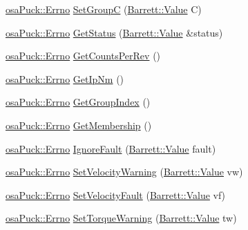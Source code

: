 \begin{DoxyCompactItemize}
\hyperlink{classosa_puck_af19c88d20083577d3a676353b4902391}{osa\-Puck\-::\-Errno} \hyperlink{classosa_puck_aed77aa5ecd5457a40cf0ccb3d2824a24}{Set\-Group\-C} (\hyperlink{struct_barrett_a57ff132885344ca62e4b4b691885685b}{Barrett\-::\-Value} C)
\item 
\hyperlink{classosa_puck_af19c88d20083577d3a676353b4902391}{osa\-Puck\-::\-Errno} \hyperlink{classosa_puck_a0446abb0c8bd038b8b496b1f02382228}{Get\-Status} (\hyperlink{struct_barrett_a57ff132885344ca62e4b4b691885685b}{Barrett\-::\-Value} \&status)
\item 
\hyperlink{classosa_puck_af19c88d20083577d3a676353b4902391}{osa\-Puck\-::\-Errno} \hyperlink{classosa_puck_a0908a1d52a613fcbbb618bdfb4d5df3a}{Get\-Counts\-Per\-Rev} ()
\item 
\hyperlink{classosa_puck_af19c88d20083577d3a676353b4902391}{osa\-Puck\-::\-Errno} \hyperlink{classosa_puck_abf8a7cea87cd6c9abaa0824363bf9b09}{Get\-Ip\-Nm} ()
\item 
\hyperlink{classosa_puck_af19c88d20083577d3a676353b4902391}{osa\-Puck\-::\-Errno} \hyperlink{classosa_puck_a3819526af24bd0f59b87dba646582182}{Get\-Group\-Index} ()
\item 
\hyperlink{classosa_puck_af19c88d20083577d3a676353b4902391}{osa\-Puck\-::\-Errno} \hyperlink{classosa_puck_aff66b18a4130053888198421bfd1b09c}{Get\-Membership} ()
\item 
\hyperlink{classosa_puck_af19c88d20083577d3a676353b4902391}{osa\-Puck\-::\-Errno} \hyperlink{classosa_puck_a4e084f70855cf653e18625d969219609}{Ignore\-Fault} (\hyperlink{struct_barrett_a57ff132885344ca62e4b4b691885685b}{Barrett\-::\-Value} fault)
\item 
\hyperlink{classosa_puck_af19c88d20083577d3a676353b4902391}{osa\-Puck\-::\-Errno} \hyperlink{classosa_puck_a8eb0fa1e2bbfbbc6d5367de197f55073}{Set\-Velocity\-Warning} (\hyperlink{struct_barrett_a57ff132885344ca62e4b4b691885685b}{Barrett\-::\-Value} vw)
\item 
\hyperlink{classosa_puck_af19c88d20083577d3a676353b4902391}{osa\-Puck\-::\-Errno} \hyperlink{classosa_puck_a709f07a317629af72d819cdb7f182f30}{Set\-Velocity\-Fault} (\hyperlink{struct_barrett_a57ff132885344ca62e4b4b691885685b}{Barrett\-::\-Value} vf)
\item 
\hyperlink{classosa_puck_af19c88d20083577d3a676353b4902391}{osa\-Puck\-::\-Errno} \hyperlink{classosa_puck_a475a911fe2e8d62a3ec598bdf8bd205f}{Set\-Torque\-Warning} (\hyperlink{struct_barrett_a57ff132885344ca62e4b4b691885685b}{Barrett\-::\-Value} tw)
\item 

\end{DoxyCompactItemize}
